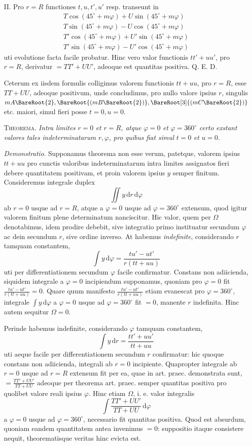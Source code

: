II. Pro $r=R$ functiones $t,u,t',u'$ resp. transeunt in
\[
\begin{gathered}
T\cos(45^\circ+m\varphi)+U\sin(45^\circ+m\varphi)\\
T\sin(45^\circ+m\varphi)-U\cos(45^\circ+m\varphi)\\
T'\cos(45^\circ+m\varphi)+U'\sin(45^\circ+m\varphi)\\
T'\sin(45^\circ+m\varphi)-U'\cos(45^\circ+m\varphi)
\end{gathered}
\]
uti evolutione facta facile probatur. Hinc vero valor functionis $tt'+uu'$, pro
$r=R$, derivatur $=TT'+UU'$, adeoque est quantitas positiva. Q. E. D.

Ceterum ex iisdem formulis colligimus valorem functionis $tt+uu$, pro $r=R$,
esse $TT+UU$, adeoque positivum, unde concludimus, pro nullo valore ipsius $r$,
singulis $mA\BareRoot{2},\BareRoot{(mB\BareRoot{2})},\BareRoot[3]{(mC\BareRoot{2})}$ etc. maiori,
simul fieri posse $t=0,u=0$.

\textsc{Theorema.} \textit{Intra limites $r=0$ et $r=R$, atque $\varphi=0$ et $\varphi=360^\circ$
certo exstant valores tales indeterminatarum $r,\varphi$, pro quibus fiat simul $t=0$ et $u=0$.}

\textit{Demonstratio.} Supponamus theorema non esse verum, patetque, valorem
ipsius $tt+uu$ pro cunctis valoribus indeterminatarum intra limites assignatos
fieri debere quantitatem positivam, et proin valorem ipsius $y$ semper finitum. Consideremus integrale duplex
\[
\iint y\,\mathrm dr\,\mathrm d\varphi
\]
ab $r=0$ usque ad $r=R$, atque a $\varphi=0$ usque ad $\varphi=360^\circ$ extensum,
quod igitur valorem finitum plene determinatum nanciscitur. Hic valor, quem
per $\Omega$ denotabimus, idem prodire debebit, sive integratio primo instituatur secundum $\varphi$ ac dein secundum $r$, sive ordine inverso. At habemus \textit{indefinite}, considerando $r$ tamquam constantem,
\[
\int y\,\mathrm d\varphi=\frac{tu'-ut'}{r(tt+uu)}
\]
uti per differentiationem secundum $\varphi$ facile confirmatur. Constans non adiicienda, siquidem integrale a $\varphi=0$ incipiendum supponamus, quoniam pro
$\varphi=0$ fit $\frac{tu'-ut'}{r(tt+uu)}=0$. Quare quum manifesto $\frac{tu'-ut'}{r(tt+uu)}$ etiam evanescat pro
$\varphi=360^\circ$, integrale $\int y\,\mathrm d\varphi$ a $\varphi=0$ usque ad $\varphi=360^\circ$ fit $=0$, manente $r$
indefinita. Hinc autem sequitur $\Omega=0$.

Perinde habemus indefinite, considerando $\varphi$ tamquam constantem,
\[
\int y\,\mathrm dr=\frac{tt'+uu'}{tt+uu}
\]
uti aeque facile per differentiationem secundum $r$ confirmatur: hic quoque constans non adiicienda, integrali ab $r=0$ incipiente. Quapropter integrale ab
$r=0$ usque ad $r=R$ extensum fit per ea, quae in art. praec. demonstrata sunt,
$=\frac{TT'+UU'}{TT+UU}$ adeoque per theorema art. praec. semper quantitas positiva pro quolibet valore reali ipsius $\varphi$. Hinc etiam $\Omega$, i. e. valor integralis
\[
\int\frac{TT'+UU'}{TT+UU}\,\mathrm d\varphi
\]
a $\varphi=0$ usque ad $\varphi=360^\circ$, necessario fit quantitas positiva. Quod est absurdum, quoniam eandem quantitatem antea invenimus $=0$: suppositio itaque
consistere nequit, theorematisque veritas hinc evicta est.

